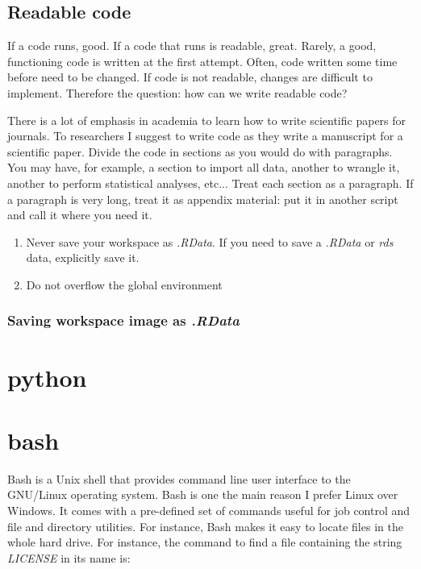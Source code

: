 \documentclass{book}
\begin{document}
\section{Readable code}
If a code runs, good. If a code that runs is readable, great. Rarely, a good, functioning code is written at the first attempt. Often, code written some time before need to be changed. If code is not readable, changes are difficult to implement. Therefore the question: how can we write readable code? 

There is a lot of emphasis in academia to learn how to write scientific papers for journals. To researchers I suggest to write code as they write a manuscript for a scientific paper. Divide the code in sections as you would do with paragraphs. You may have, for example, a section to import all data, another to wrangle it, another to perform statistical analyses, etc... Treat each section as a paragraph. If a paragraph is very long, treat it as appendix material: put it in another script and call it where you need it.

\begin{enumerate}
    \item Never save your workspace as \textit{.RData}. If you need to save a \textit{.RData} or \textit{rds} data, explicitly save it. 
    \item Do not overflow the global environment
\end{enumerate}

\subsection{Saving workspace image as \textit{.RData}}

\chapter{python}

\chapter{bash}
\lstset{language=bash}

Bash is a Unix shell that provides command line user interface to the GNU/Linux operating system. Bash is one the main reason I prefer Linux over Windows. It comes with a pre-defined set of commands useful for job control and file and directory utilities. For instance, Bash makes it easy to locate files in the whole hard drive. For instance, the command to find a file containing the string \textit{LICENSE} in its name is:
\end{document}
